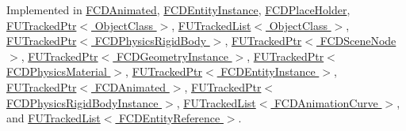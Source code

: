 Implemented in \hyperlink{classFCDAnimated_af56690d3ce4fcec0caceff540129ba97}{FCDAnimated}, \hyperlink{classFCDEntityInstance_ae66647da209d1030a2e4a36ac3bd7d63}{FCDEntityInstance}, \hyperlink{classFCDPlaceHolder_af9c5b9d7ae1d24593ca7d75f338653a5}{FCDPlaceHolder}, \hyperlink{classFUTrackedPtr_afb32d45ac4620963033cd64ee95a2ee1}{FUTrackedPtr$<$ ObjectClass $>$}, \hyperlink{classFUTrackedList_aa4133eacd415bfb7650543870eadcc17}{FUTrackedList$<$ ObjectClass $>$}, \hyperlink{classFUTrackedPtr_afb32d45ac4620963033cd64ee95a2ee1}{FUTrackedPtr$<$ FCDPhysicsRigidBody $>$}, \hyperlink{classFUTrackedPtr_afb32d45ac4620963033cd64ee95a2ee1}{FUTrackedPtr$<$ FCDSceneNode $>$}, \hyperlink{classFUTrackedPtr_afb32d45ac4620963033cd64ee95a2ee1}{FUTrackedPtr$<$ FCDGeometryInstance $>$}, \hyperlink{classFUTrackedPtr_afb32d45ac4620963033cd64ee95a2ee1}{FUTrackedPtr$<$ FCDPhysicsMaterial $>$}, \hyperlink{classFUTrackedPtr_afb32d45ac4620963033cd64ee95a2ee1}{FUTrackedPtr$<$ FCDEntityInstance $>$}, \hyperlink{classFUTrackedPtr_afb32d45ac4620963033cd64ee95a2ee1}{FUTrackedPtr$<$ FCDAnimated $>$}, \hyperlink{classFUTrackedPtr_afb32d45ac4620963033cd64ee95a2ee1}{FUTrackedPtr$<$ FCDPhysicsRigidBodyInstance $>$}, \hyperlink{classFUTrackedList_aa4133eacd415bfb7650543870eadcc17}{FUTrackedList$<$ FCDAnimationCurve $>$}, and \hyperlink{classFUTrackedList_aa4133eacd415bfb7650543870eadcc17}{FUTrackedList$<$ FCDEntityReference $>$}.

